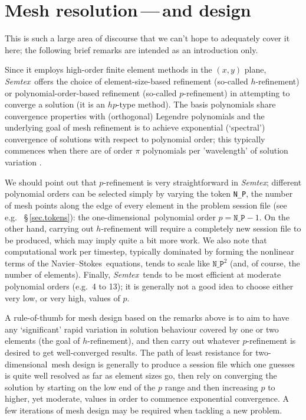 \documentclass[11pt]{report}
\newcommand{\Semtex}{\emph{Semtex}} \newcommand{\Dog}{\emph{Dog}}
\newcommand\oned{one-di\-men\-sion\-al}
\newcommand\twod{two-di\-men\-sion\-al}
\newcommand{\eg}{e.g.\ } \newcommand{\CC}{\mathrm{c.c.}}
\newcommand\NavSto{Navier--Stokes}
\begin{document}
\section{Mesh resolution\,---\,and design}

This is such a large area of discourse that we can't hope to
adequately cover it here; the following brief remarks are intended as
an introduction only.

Since it employs high-order finite element methods in the $(x,y)$
plane, \Semtex\ offers the choice of element-size-based refinement
(so-called $h$-refinement) or polynomial-order-based refinement
(so-called $p$-refinement) in attempting to converge a solution (it is
an $hp$-type method).  The basis polynomials share convergence
properties with (orthogonal) Legendre polynomials and the underlying
goal of mesh refinement is to achieve exponential (`spectral')
convergence of solutions with respect to polynomial order; this
typically commences when there are of order $\pi$ polynomials per
'wavelength' of solution variation \citep{gs77}.

We should point out that $p$-refinement is very straightforward in
\Semtex; different polynomial orders can be selected simply by varying
the token \verb|N_P|, the number of mesh points along the edge of
every element in the problem session file (see \eg
\S\,\ref{sec.tokens}): the \oned\ polynomial order
$p=\texttt{N\_P}-1$.
%
On the other hand, carrying out $h$-refinement will require a
completely new session file to be produced, which may imply quite a
bit more work.
%
We also note that computational work per timestep, typically dominated
by forming the nonlinear terms of the \NavSto\ equations, tends to
scale like $\texttt{N\_P}^2$ (and, of course, the number of elements).
%
Finally, \Semtex\ tends to be most efficient at moderate polynomial
orders (\eg 4 to 13); it is generally not a good idea to choose either
very low, or very high, values of $p$.

A rule-of-thumb for mesh design based on the remarks above is to aim
to have any `significant' rapid variation in solution behaviour
covered by one or two elements (the goal of $h$-refinement), and then
carry out whatever $p$-refinement is desired to get well-converged
results.
%
The path of least resistance for \twod\ mesh design is
generally to produce a session file which one guesses is quite well
resolved as far as element sizes go, then rely on converging the
solution by starting on the low end of the $p$ range and then
increasing $p$ to higher, yet moderate, values in order to commence
exponential convergence.  A few iterations of mesh design may be
required when tackling a new problem.
%
\end{document}
